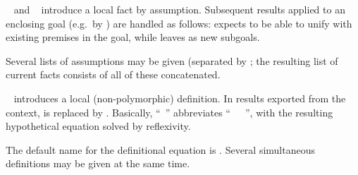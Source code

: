 \begin{isabellebody}
\begin{isamarkuptext}
\begin{descr}
  \item [\hyperlink{command.assume}{\mbox{\isa{\isacommand{assume}}}}~\isa{{\isachardoublequote}a{\isacharcolon}\ {\isasymphi}{\isachardoublequote}} and \hyperlink{command.presume}{\mbox{\isa{\isacommand{presume}}}}~\isa{{\isachardoublequote}a{\isacharcolon}\ {\isasymphi}{\isachardoublequote}}] introduce a local fact \isa{{\isachardoublequote}{\isasymphi}\ {\isasymturnstile}\ {\isasymphi}{\isachardoublequote}} by
  assumption.  Subsequent results applied to an enclosing goal (e.g.\
  by \hyperlink{command.show}{\mbox{}}) are handled as follows: \hyperlink{command.assume}{\mbox{}} expects to be able to unify with existing premises in the
  goal, while \hyperlink{command.presume}{\mbox{\isa{\isacommand{presume}}}} leaves \isa{{\isasymphi}} as new subgoals.
  
  Several lists of assumptions may be given (separated by
  \hyperlink{keyword.and}{\mbox{}}; the resulting list of current facts consists
  of all of these concatenated.
  
  \item [\hyperlink{command.def}{\mbox{\isa{\isacommand{def}}}}~\isa{{\isachardoublequote}x\ {\isasymequiv}\ t{\isachardoublequote}}] introduces a local
  (non-polymorphic) definition.  In results exported from the context,
  \isa{x} is replaced by \isa{t}.  Basically, ``\hyperlink{command.def}{\mbox{}}~'' abbreviates ``\hyperlink{command.fix}{\mbox{}}~~\hyperlink{command.assume}{\mbox{}}~'', with the resulting
  hypothetical equation solved by reflexivity.
  
  The default name for the definitional equation is .
  Several simultaneous definitions may be given at the same time.

  \end{descr}


\end{isamarkuptext}
\end{isabellebody}

